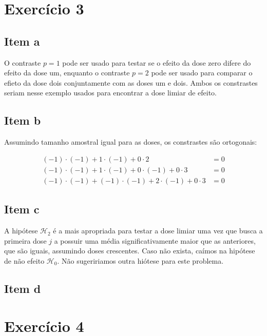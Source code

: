\documentclass[
  portuguese,
  letterpaper,
  DIV=11,
  numbers=noendperiod]{scrarticle}
\begin{document}
\section{Exercício 3}\label{exercuxedcio-3}

\subsection{Item a}\label{item-a-1}

O contraste \(p=1\) pode ser usado para testar se o efeito da dose zero
difere do efeito da dose um, enquanto o contraste \(p=2\) pode ser usado
para comparar o efieto da dose dois conjuntamente com as doses um e
dois. Ambos os constrastes seriam nesse exemplo usados para encontrar a
dose limiar de efeito.

\subsection{Item b}\label{item-b-1}

Assumindo tamanho amostral igual para as doses, os constrastes são
ortogonais:

\[
\begin{aligned}
(-1) \cdot (-1) + 1 \cdot (-1) + 0 \cdot 2 &= 0 \\
(-1) \cdot (-1) + 1 \cdot (-1) + 0 \cdot (-1) + 0 \cdot 3 &= 0 \\
(-1) \cdot (-1) + (-1) \cdot (-1) + 2 \cdot (-1) + 0 \cdot 3 &= 0
\end{aligned}
\]

\subsection{Item c}\label{item-c-1}

A hipótese \(\mathcal{H}_2\) é a mais apropriada para testar a dose
limiar uma vez que busca a primeira dose \(j\) a possuir uma média
significativamente maior que as anteriores, que são iguais, assumindo
doses crescentes. Caso não exista, caímos na hipótese de não efeito
\(\mathcal{H}_0\). Não sugeririamos outra hiótese para este problema.

\subsection{Item d}\label{item-d}

\section{Exercício 4}\label{exercuxedcio-4}
\end{document}
